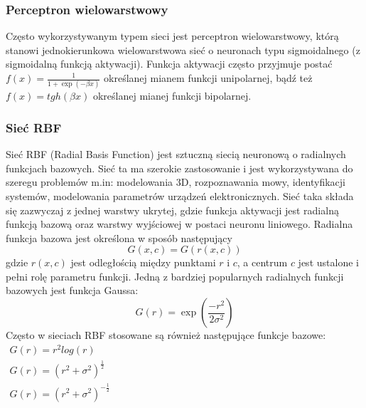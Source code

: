 \subsubsection*{Perceptron wielowarstwowy}
Często wykorzystywanym typem sieci jest perceptron wielowarstwowy, którą stanowi jednokierunkowa wielowarstwowa sieć o neuronach typu sigmoidalnego (z sigmoidalną funkcją aktywacji)\cite{Osowski}. Funkcja aktywacji często przyjmuje postać $f(x) = \frac{1}{1 + \exp(-\beta x)}$ określanej mianem funkcji unipolarnej, bądź też $f(x) = tgh(\beta x)$ określanej mianej funkcji bipolarnej.
 
\subsubsection*{Sieć RBF}
Sieć RBF (Radial Basis Function) jest sztuczną siecią neuronową o radialnych funkcjach bazowych. Sieć ta ma szerokie zastosowanie i jest wykorzystywana do szeregu problemów m.in: modelowania 3D, rozpoznawania mowy, identyfikacji systemów, modelowania parametrów urządzeń elektronicznych\cite{Bors}. Sieć taka składa się zazwyczaj z jednej warstwy ukrytej, gdzie funkcja aktywacji jest radialną funkcją bazową oraz warstwy wyjściowej w postaci neuronu liniowego. Radialna funkcja bazowa jest określona w sposób następujący\cite{Bartkowiak}
\begin{equation}
	G(x,c) = G(r(x,c))
\end{equation}
gdzie $r(x,c)$ jest odległością między punktami $r$ i $c$, a centrum $c$ jest ustalone i pełni rolę parametru funkcji. Jedną z bardziej popularnych radialnych funkcji bazowych jest funkcja Gaussa:
\begin{equation}
	G(r) = \exp(\frac{-r^2}{2\sigma^2})
\end{equation}
Często w sieciach RBF stosowane są również następujące funkcje bazowe\cite{Chen}: \\
$\begin{array}{l}
 G(r) = r^2 log(r)\\
 G(r) = (r^2 + \sigma^2)^{\frac{1}{2}} \\
 G(r) = (r^2 + \sigma^2)^{-\frac{1}{2}}
\end{array}
$
